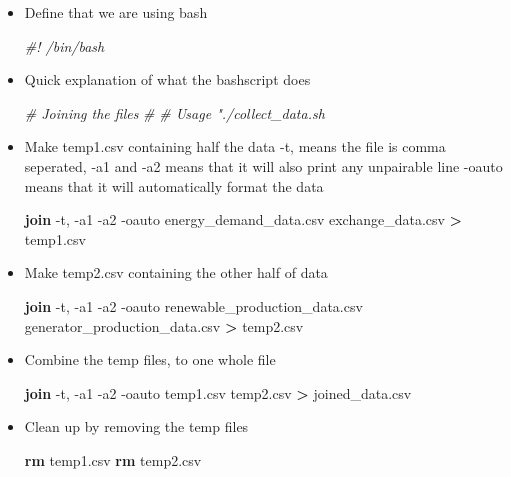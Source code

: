 \documentclass[11pt]{article}
\newenvironment{Shaded}{}{}
\newcommand{\KeywordTok}[1]{\textcolor[rgb]{0.00,0.44,0.13}{\textbf{{#1}}}}
\newcommand{\CommentTok}[1]{\textcolor[rgb]{0.38,0.63,0.69}{\textit{{#1}}}}
\newcommand{\NormalTok}[1]{{#1}}
\begin{document}
\begin{itemize}
\item
  Define that we are using bash

\begin{Shaded}
\begin{Highlighting}[]
\CommentTok{#! /bin/bash}
\end{Highlighting}
\end{Shaded}
\item
  Quick explanation of what the bashscript does

\begin{Shaded}
\begin{Highlighting}[]
\CommentTok{# Joining the files}
\CommentTok{#}
\CommentTok{# Usage "./collect_data.sh }
\end{Highlighting}
\end{Shaded}
\item
  Make temp1.csv containing half the data -t, means the file is comma
  seperated, -a1 and -a2 means that it will also print any unpairable
  line -oauto means that it will automatically format the data

\begin{Shaded}
\begin{Highlighting}[]
\KeywordTok{join} \NormalTok{-t, -a1 -a2 -oauto energy_demand_data.csv exchange_data.csv }\KeywordTok{>} \NormalTok{temp1.csv}
\end{Highlighting}
\end{Shaded}
\item
  Make temp2.csv containing the other half of data

\begin{Shaded}
\begin{Highlighting}[]
\KeywordTok{join} \NormalTok{-t, -a1 -a2 -oauto renewable_production_data.csv generator_production_data.csv }\KeywordTok{>} \NormalTok{temp2.csv}
\end{Highlighting}
\end{Shaded}
\item
  Combine the temp files, to one whole file

\begin{Shaded}
\begin{Highlighting}[]
\KeywordTok{join} \NormalTok{-t, -a1 -a2 -oauto temp1.csv temp2.csv }\KeywordTok{>} \NormalTok{joined_data.csv}
\end{Highlighting}
\end{Shaded}
\item
  Clean up by removing the temp files

\begin{Shaded}
\begin{Highlighting}[]
\KeywordTok{rm} \NormalTok{temp1.csv}
\KeywordTok{rm} \NormalTok{temp2.csv}
\end{Highlighting}
\end{Shaded}
\end{itemize}
\end{document}
